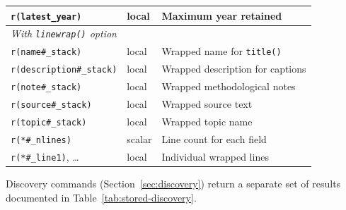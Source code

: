 \documentclass[bib]{statapress}
\begin{document}
\begin{table}[htbp]
\begin{tabular}{llp{6.5cm}}
\texttt{r(latest\_year)} & local & Maximum year retained \\
\hline
\multicolumn{3}{l}{\textit{With \texttt{linewrap()} option}} \\
\texttt{r(name\#\_stack)} & local & Wrapped name for \texttt{title()} \\
\texttt{r(description\#\_stack)} & local & Wrapped description for captions \\
\texttt{r(note\#\_stack)} & local & Wrapped methodological notes \\
\texttt{r(source\#\_stack)} & local & Wrapped source text \\
\texttt{r(topic\#\_stack)} & local & Wrapped topic name \\
\texttt{r(*\#\_nlines)} & scalar & Line count for each field \\
\texttt{r(*\#\_line1)}, \ldots & local & Individual wrapped lines \\
\hline
\end{tabular}
\end{table}

Discovery commands (Section~\ref{sec:discovery}) return a separate set of
results documented in Table~\ref{tab:stored-discovery}.
\end{document}
